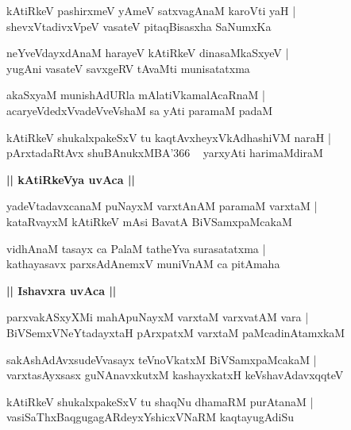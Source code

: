 \documentclass[twoside,12pt,openright]{book}
\newcounter{shloka}[chapter]
\def\uvaca#1{\centerline{{\large\textbf{#1}}}}
\begin{document}
\begin{shloka}%
kAtiRkeV pashirxmeV yAmeV satxvagAnaM karoVti yaH |\\
shevxVtadivxVpeV vasateV pitaqBisasxha SaNumxKa 
\end{shloka}

\begin{shloka}%
neYveVdayxdAnaM harayeV kAtiRkeV dinasaMkaSxyeV |\\
yugAni vasateV savxgeRV tAvaMti munisatatxma
\end{shloka}

\begin{shloka}%
akaSxyaM munishAdURla mAlatiVkamalAcaRnaM |\\
acaryeVdedxVvadeVveVshaM sa yAti paramaM padaM
\end{shloka}

\begin{shloka}%
kAtiRkeV shukalxpakeSxV tu kaqtAvxheyxVkAdhashiVM naraH |\\
pArxtadaRtAvx shuBAnukxMBA\char'366 ~ yarxyAti harimaMdiraM 
\end{shloka}

\uvaca{|| kAtiRkeVya uvAca ||}

\begin{shloka}%
yadeVtadavxcanaM puNayxM varxtAnAM paramaM varxtaM |\\
kataRvayxM kAtiRkeV mAsi BavatA BiVSamxpaMcakaM 
\end{shloka}

\begin{shloka}%
vidhAnaM tasayx ca PalaM tatheYva surasatatxma |\\
kathayasavx parxsAdAnemxV muniVnAM ca pitAmaha
\end{shloka}

\uvaca{|| Ishavxra uvAca ||}

\begin{shloka}%
parxvakASxyXMi mahApuNayxM varxtaM varxvatAM vara |\\
BiVSemxVNeYtadayxtaH pArxpatxM varxtaM paMcadinAtamxkaM 
\end{shloka}

\begin{shloka}%
sakAshAdAvxsudeVvasayx teVnoVkatxM BiVSamxpaMcakaM |\\
varxtasAyxsasx guNAnavxkutxM kashayxkatxH keVshavAdavxqqteV 
\end{shloka}

\begin{shloka}%
kAtiRkeV shukalxpakeSxV tu shaqNu dhamaRM purAtanaM |\\
vasiSaThxBaqgugagARdeyxYshicxVNaRM kaqtayugAdiSu 
\end{shloka}
\end{document}
